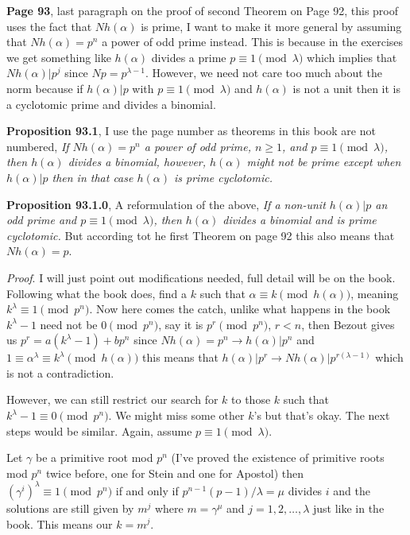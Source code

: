 \documentclass[aps,preprint,preprintnumbers,nofootinbib,showpacs,prd]{revtex4-1}
\begin{document}
{\bf Page 93}, last paragraph on the proof of second Theorem on Page 92, this proof uses the fact that $Nh(\alpha)$ is prime, I want to make it more general by assuming that $Nh(\alpha) = p^n$ a power of odd prime instead. This is because in the exercises we get something like $h(\alpha)$ divides a prime $p \equiv 1 \pmod{\lambda}$ which implies that $Nh(\alpha) | p^j$ since $N p = p^{\lambda - 1}$. However, we need not care too much about the norm because if $h(\alpha)|p$ with $p \equiv 1 \pmod{\lambda}$ and $h(\alpha)$ is not a unit then it is a cyclotomic prime and divides a binomial.

{\bf Proposition 93.1}, I use the page number as theorems in this book are not numbered, {\it If $Nh(\alpha) = p^n$ a power of odd prime, $n \ge 1$, and $p \equiv 1 \pmod{\lambda}$, then $h(\alpha)$ divides a binomial, however, $h(\alpha)$ might not be prime except when $h(\alpha)|p$ then in that case $h(\alpha)$ is prime cyclotomic.}

{\bf Proposition 93.1.0}, A reformulation of the above, {\it If a non-unit $h(\alpha) | p$ an odd prime and $p \equiv 1 \pmod{\lambda}$, then $h(\alpha)$ divides a binomial and is prime cyclotomic.} But according tot he first Theorem on page 92 this also means that $Nh(\alpha) = p$.

{\it Proof}. I will just point out modifications needed, full detail will be on the book. Following what the book does, find a $k$ such that $\alpha \equiv k \pmod{h(\alpha)}$, meaning $k^\lambda \equiv 1 \pmod{p^n}$. Now here comes the catch, unlike what happens in the book $k^\lambda - 1$ need not be $0 \pmod{p^n}$, say it is $p^r \pmod{p^n}$, $r < n$, then Bezout gives us $p^r = a(k^\lambda - 1) + bp^n$ since $Nh(\alpha) = p^n \to h(\alpha) | p^n$ and $1 \equiv \alpha^\lambda \equiv k^\lambda \pmod{h(\alpha)}$ this means that $h(\alpha) | p^r \to Nh(\alpha) | p^{r(\lambda-1)}$ which is not a contradiction.

However, we can still restrict our search for $k$ to those $k$ such that $k^\lambda - 1 \equiv 0 \pmod{p^n}$. We might miss some other $k$'s but that's okay. The next steps would be similar. Again, assume $p \equiv 1 \pmod{\lambda}$.

Let $\gamma$ be a primitive root mod $p^n$ (I've proved the existence of primitive roots mod $p^n$ twice before, one for Stein and one for Apostol) then $(\gamma^i)^\lambda \equiv 1 \pmod{p^n}$ if and only if $p^{n-1}(p - 1)/\lambda = \mu$ divides $i$ and the solutions are still given by $m^j$ where $m = \gamma^\mu$ and $j = 1,2,\dots,\lambda$ just like in the book. This means our $k = m^j$.
\end{document}
